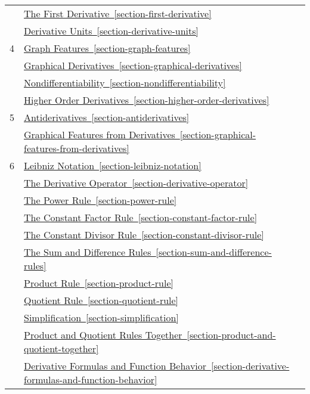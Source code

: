 \documentclass[12pt,]{book}
\theoremstyle{plain}
\theoremstyle{definition}
\numberwithin{equation}{section}
\newcommand{\hrulemedium}{\noalign{\hrule height 0.07em}}
\begin{document}
\begin{longtable}{clc}
&\hyperref[section-first-derivative]{The First Derivative~\ref*{section-first-derivative}}&\\
&\hyperref[section-derivative-units]{Derivative Units~\ref*{section-derivative-units}}&\\\hrulemedium
4&\hyperref[section-graph-features]{Graph Features~\ref*{section-graph-features}}&\\
&\hyperref[section-graphical-derivatives]{Graphical Derivatives~\ref*{section-graphical-derivatives}}&\\
&\hyperref[section-nondifferentiability]{Nondifferentiability~\ref*{section-nondifferentiability}}&\\
&\hyperref[section-higher-order-derivatives]{Higher Order Derivatives~\ref*{section-higher-order-derivatives}}&\\\hrulemedium
5&\hyperref[section-antiderivatives]{Antiderivatives~\ref*{section-antiderivatives}}&\\
&\hyperref[section-graphical-features-from-derivatives]{Graphical Features from Derivatives~\ref*{section-graphical-features-from-derivatives}}&\\\hrulemedium
6&\hyperref[section-leibniz-notation]{Leibniz Notation~\ref*{section-leibniz-notation}}&\\
&\hyperref[section-derivative-operator]{The Derivative Operator~\ref*{section-derivative-operator}}&\\
&\hyperref[section-power-rule]{The Power Rule~\ref*{section-power-rule}}&\\
&\hyperref[section-constant-factor-rule]{The Constant Factor Rule~\ref*{section-constant-factor-rule}}&\\
&\hyperref[section-constant-divisor-rule]{The Constant Divisor Rule~\ref*{section-constant-divisor-rule}}&\\
&\hyperref[section-sum-and-difference-rules]{The Sum and Difference Rules~\ref*{section-sum-and-difference-rules}}&\\
&\hyperref[section-product-rule]{Product Rule~\ref*{section-product-rule}}&\\
&\hyperref[section-quotient-rule]{Quotient Rule~\ref*{section-quotient-rule}}&\\
&\hyperref[section-simplification]{Simplification~\ref*{section-simplification}}&\\
&\hyperref[section-product-and-quotient-together]{Product and Quotient Rules Together~\ref*{section-product-and-quotient-together}}&\\
&\hyperref[section-derivative-formulas-and-function-behavior]{Derivative Formulas and Function Behavior~\ref*{section-derivative-formulas-and-function-behavior}}&
\end{longtable}
\mainmatter
\typeout{************************************************}
\typeout{************************************************}
\end{document}
